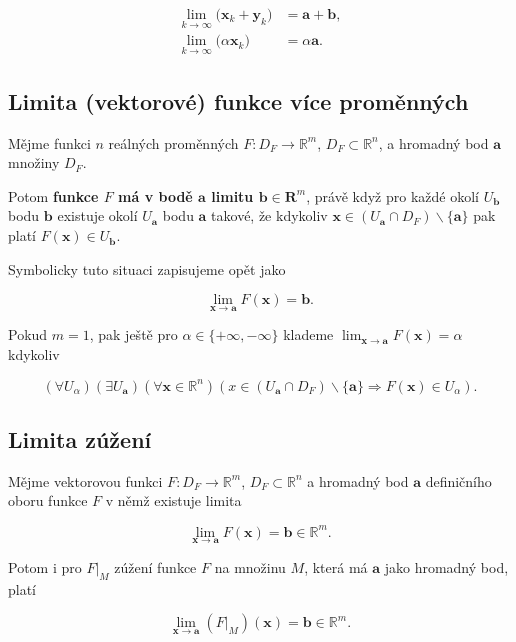 \begin{align}
    \lim_{k\to\infty} \big( \mathbf{x}_k + \mathbf{y}_k \big) & = \mathbf{a} + \mathbf{b}, \\
    \lim_{k\to\infty} \big( \alpha \mathbf{x}_k \big)         & = \alpha \mathbf{a}.
\end{align}

\subsection*{Limita (vektorové) funkce více proměnných}

Mějme funkci $n$ reálných proměnných $F: D_F \to \mathbb{R}^m$, $D_F \subset
    \mathbb{R}^n$, a hromadný bod $\mathbf{a}$ množiny $D_F$.

\noindent Potom \textbf{funkce $F$ má v bodě $\mathbf{a}$ limitu $\mathbf{b}\in\mathbf{R}^m$}, právě když pro každé okolí $U_\mathbf{b}$ bodu $\mathbf{b}$ existuje okolí $U_\mathbf{a}$ bodu $\mathbf{a}$ takové, že kdykoliv $\mathbf{x} \in (U_\mathbf{a} \cap D_F) \smallsetminus \{\mathbf{a}\}$ pak platí $F(\mathbf{x}) \in U_\mathbf{b}$.

\noindent Symbolicky tuto situaci zapisujeme opět jako

\[ \lim_{\mathbf{x} \to \mathbf{a}} F(\mathbf{x}) = \mathbf{b}. \]

\noindent Pokud $m = 1$, pak ještě pro $\alpha \in \{+\infty, -\infty\}$ klademe $\displaystyle\lim_{\mathbf{x} \to \mathbf{a}} F(\mathbf{x}) = \alpha$ kdykoliv

\[ (\forall U_{\alpha})(\exists U_\mathbf{a})(\forall \mathbf{x} \in \mathbb{R}^n)(x \in (U_\mathbf{a} \cap D_F) \smallsetminus \{\mathbf{a}\} \Rightarrow F(\mathbf{x}) \in U_{\alpha}). \]

\subsection*{Limita zúžení}

Mějme vektorovou funkci $F: D_F \to \mathbb{R}^m$, $D_F \subset \mathbb{R}^n$ a
hromadný bod $\mathbf{a}$ definičního oboru funkce $F$ v němž existuje limita

\[ \lim_{\mathbf{x} \to \mathbf{a}} F(\mathbf{x}) = \mathbf{b} \in \mathbb{R}^m. \]

\noindent Potom i pro $F|_M$ zúžení funkce $F$ na množinu $M$, která má $\mathbf{a}$ jako hromadný bod, platí

\[ \lim_{\mathbf{x} \to \mathbf{a}} (F|_M)(\mathbf{x}) = \mathbf{b} \in \mathbb{R}^m. \]

